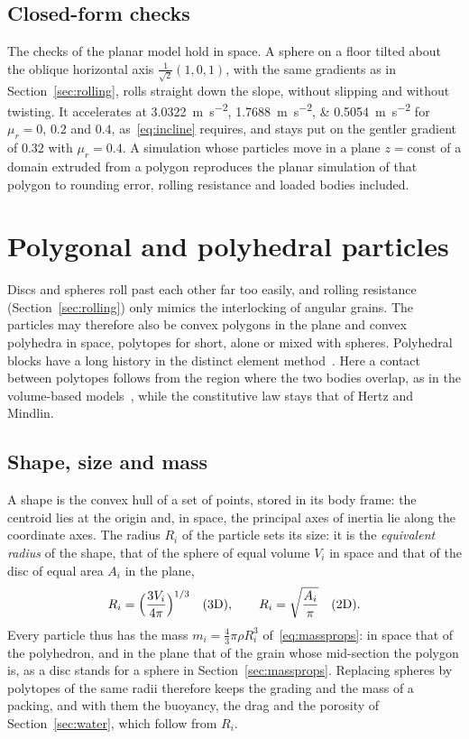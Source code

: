 \subsection{Closed-form checks}

The checks of the planar model hold in space.
A sphere on a floor tilted about the oblique horizontal axis $\tfrac{1}{\sqrt{2}}(1,0,1)$, with the same gradients as in Section~\ref{sec:rolling}, rolls straight down the slope, without slipping and without twisting.
It accelerates at \qtylist{3.0322;1.7688;0.5054}{\metre\per\second\squared} for $\mu_{r}=0$, $0.2$ and $0.4$, as~\eqref{eq:incline} requires, and stays put on the gentler gradient of $0.32$ with $\mu_{r}=0.4$.
A simulation whose particles move in a plane $z=\text{const}$ of a domain extruded from a polygon reproduces the planar simulation of that polygon to rounding error, rolling resistance and loaded bodies included.

\section{Polygonal and polyhedral particles}
\label{sec:polytopes}

Discs and spheres roll past each other far too easily, and rolling resistance (Section~\ref{sec:rolling}) only mimics the interlocking of angular grains.
The particles may therefore also be convex polygons in the plane and convex polyhedra in space, polytopes for short, alone or mixed with spheres.
Polyhedral blocks have a long history in the distinct element method~\cite{cundall1988}.
Here a contact between polytopes follows from the region where the two bodies overlap, as in the volume-based models~\cite{feng2012,nassauer2013,elias2014}, while the constitutive law stays that of Hertz and Mindlin.

\subsection{Shape, size and mass}

A shape is the convex hull of a set of points, stored in its body frame: the centroid lies at the origin and, in space, the principal axes of inertia lie along the coordinate axes.
The radius $R_{i}$ of the particle sets its size: it is the \emph{equivalent radius} of the shape, that of the sphere of equal volume $V_{i}$ in space and that of the disc of equal area $A_{i}$ in the plane,
\begin{equation}
  R_{i} = \Bigl(\frac{3V_{i}}{4\pi}\Bigr)^{1/3}\quad\text{(3D)},
  \qquad
  R_{i} = \sqrt{\frac{A_{i}}{\pi}}\quad\text{(2D)}.
  \label{eq:equivalent-radius}
\end{equation}
Every particle thus has the mass $m_{i}=\tfrac{4}{3}\pi\rho R_{i}^{3}$ of~\eqref{eq:massprops}: in space that of the polyhedron, and in the plane that of the grain whose mid-section the polygon is, as a disc stands for a sphere in Section~\ref{sec:massprops}.
Replacing spheres by polytopes of the same radii therefore keeps the grading and the mass of a packing, and with them the buoyancy, the drag and the porosity of Section~\ref{sec:water}, which follow from $R_{i}$.

